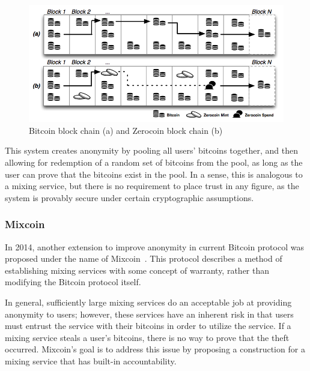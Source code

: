 \documentclass[11pt]{article}
\begin{document}
\begin{figure}[H]
    \centering
    \caption[Bitcoin block chain (a) and Zerocoin block chain (b)]{Bitcoin block
        chain (a) and Zerocoin block chain (b)~\cite{miers13}}
    \includegraphics[width=\linewidth,natwidth=806,natheight=371]{figures/zerocoin.png}
\end{figure}

This system creates anonymity by pooling all users' bitcoins together, and then
allowing for redemption of a random set of bitcoins from the pool, as long as
the user can prove that the bitcoins exist in the pool. In a sense, this is
analogous to a mixing service, but there is no requirement to place trust in any
figure, as the system is provably secure under certain cryptographic
assumptions.

\subsubsection{Mixcoin}
In 2014, another extension to improve anonymity in current Bitcoin protocol
was proposed under the name of Mixcoin~\cite{bonneau14}. This protocol
describes a method of establishing mixing services with some concept of
warranty, rather than modifying the Bitcoin protocol itself.

In general, sufficiently large mixing services do an acceptable job at providing
anonymity to users; however, these services have an inherent risk in that users
must entrust the service with their bitcoins in order to utilize the service.
If a mixing service steals a user's bitcoins, there is no way to prove that the
theft occurred. Mixcoin's goal is to address this issue by proposing a
construction for a mixing service that has built-in accountability.
\end{document}
